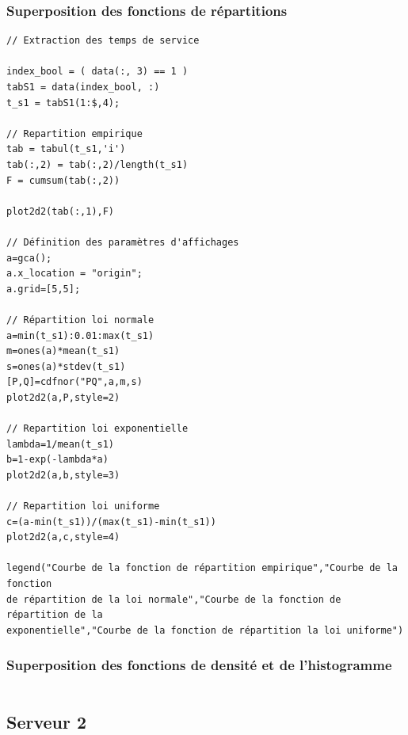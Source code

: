 \documentclass{article}
\begin{document}
\subsubsection{Superposition des fonctions de répartitions}
\begin{verbatim}
// Extraction des temps de service

index_bool = ( data(:, 3) == 1 )
tabS1 = data(index_bool, :)
t_s1 = tabS1(1:$,4);

// Repartition empirique
tab = tabul(t_s1,'i')
tab(:,2) = tab(:,2)/length(t_s1)
F = cumsum(tab(:,2))

plot2d2(tab(:,1),F)

// Définition des paramètres d'affichages
a=gca();
a.x_location = "origin";
a.grid=[5,5];

// Répartition loi normale
a=min(t_s1):0.01:max(t_s1)
m=ones(a)*mean(t_s1)
s=ones(a)*stdev(t_s1)
[P,Q]=cdfnor("PQ",a,m,s)
plot2d2(a,P,style=2)

// Repartition loi exponentielle
lambda=1/mean(t_s1)
b=1-exp(-lambda*a)
plot2d2(a,b,style=3)

// Repartition loi uniforme
c=(a-min(t_s1))/(max(t_s1)-min(t_s1))
plot2d2(a,c,style=4)

legend("Courbe de la fonction de répartition empirique","Courbe de la fonction
de répartition de la loi normale","Courbe de la fonction de répartition de la 
exponentielle","Courbe de la fonction de répartition la loi uniforme")
\end{verbatim}

\subsubsection{Superposition des fonctions de densité et de l'histogramme}
\begin{verbatim}
\end{verbatim}

\subsection{Serveur 2}
\end{document}
